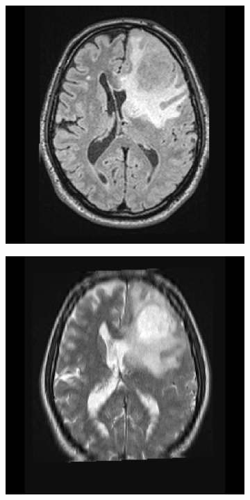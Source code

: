 \begin{figure}[hbt]
    \begin{subfigure}[b]{0.45\textwidth}
        \centering
        \includegraphics[width=\textwidth]{Figures/FLAIR.png}
        \caption{}\label{fig:intro_FLAIR}
    \end{subfigure}
    \begin{subfigure}[b]{0.45\textwidth}
        \centering
        \includegraphics[width=\textwidth]{Figures/T2.png}
        \caption{}\label{fig:intro_T2}
    \end{subfigure}


\end{figure}
